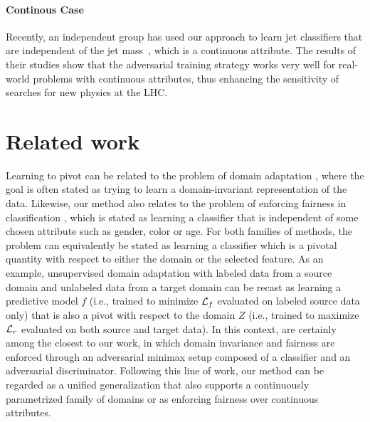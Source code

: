 \documentclass{article}
\theoremstyle{plain}
\begin{document}
\paragraph{Continous Case}
Recently, an independent group has used our approach to learn jet classifiers
that are independent of the jet mass~\citep{Shimmin:2017mfk}, which is a continuous attribute.
The results of their studies show that the adversarial training strategy works very well for
real-world problems with continuous attributes, thus enhancing the sensitivity of searches for
new physics at the LHC.



\section{Related work}
\label{sec:related}

Learning to pivot can be related to the problem
of domain adaptation
\citep{blitzer2006domain,pan2011domain,gopalan2011domain,gong2013connecting,baktashmotlagh2013unsupervised,ajakan2014domain,ganin2014unsupervised},
where the goal is often stated as trying to learn a domain-invariant
representation of the data. Likewise, our method also relates to the problem of
enforcing fairness in classification
\citep{kamishima2012fairness,zemel2013learning,feldman2015certifying,EdwardsS15,zafar2015fairness,louizos2015variational},
which is stated as learning a classifier that is independent of some chosen
attribute such as gender, color or age. For both families of methods, the
problem can equivalently be stated as learning a classifier which is a pivotal
quantity with respect to either the domain or the selected feature. As an
example, unsupervised domain adaptation with labeled data from a source domain
and unlabeled data from a target domain can be recast as learning a predictive
model $f$ (i.e., trained to minimize ${\cal L}_f$ evaluated on labeled source
data only) that is also a pivot with respect to the domain $Z$ (i.e., trained to
maximize ${\cal L}_r$ evaluated on both source and target data). In this
context, \citep{ganin2014unsupervised,EdwardsS15} are certainly among the
closest to our work, in which domain invariance and fairness are enforced
through an adversarial minimax setup composed of a classifier and an adversarial
discriminator. Following this line of work, our method can be regarded as a unified generalization that also supports
a continuously parametrized family of domains or as enforcing fairness over
continuous attributes.
\end{document}
